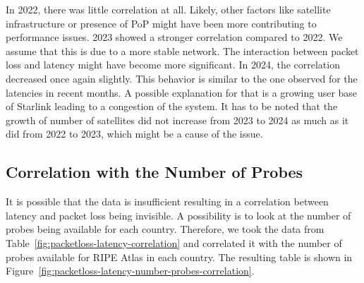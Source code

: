 In 2022, there was little correlation at all. Likely, other factors like satellite infrastructure or presence of \ac{PoP} might have been more contributing to performance issues.
2023 showed a stronger correlation compared to 2022. We assume that this is due to a more stable network. The interaction between packet loss and latency might have become more significant.
In 2024, the correlation decreased once again slightly. This behavior is similar to the one observed for the latencies in recent months. A possible explanation for that is a growing user base of Starlink leading to a congestion of the system. It has to be noted that the growth of number of satellites did not increase from 2023 to 2024 as much as it did from 2022 to 2023, which might be a cause of the issue.

\subsection{Correlation with the Number of Probes} \label{sec:number-of-probes-correlation}

It is possible that the data is insufficient resulting in a correlation between latency and packet loss being invisible.
A possibility is to look at the number of probes being available for each country. Therefore, we took the data from Table~\ref{fig:packetloss-latency-correlation} and correlated it with the number of probes available for RIPE Atlas in each country. The resulting table is shown in Figure~\ref{fig:packetloss-latency-number-probes-correlation}.

